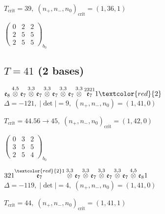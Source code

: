 \documentclass[10pt]{article}
\begin{document}
\hspace{1em}$T_{\text{crit}}=39,\; (n_+,n_-,n_0)_{\text{crit}}=(1,36,1)$

\hspace{2em}$\left(\begin{smallmatrix}0 & 2 & 2 \\ 2 & 5 & 5 \\ 2 & 5 & 5\end{smallmatrix}\right)_{\!b_0}$


\subsection*{$T = 41$ \quad (2 bases)}
\smallskip

$\mathfrak{e}_8\overset{4,5}{\otimes}\mathfrak{e}_7\overset{3,3}{\otimes}\mathfrak{e}_7\overset{3,3}{\otimes}\mathfrak{e}_7\overset{3,3}{\otimes}\mathfrak{e}_7\overset{3,3}{\otimes}\overset{2321}{\mathfrak{e}_7}1\textcolor{red}{2}$ \quad $\Delta=-121,\; |\det|=9,\; (n_+,n_-,n_0)=(1,41,0)$

\hspace{1em}$T_{\text{crit}}=44.56 \to 45,\; (n_+,n_-,n_0)_{\text{crit}}=(1,42,0)$

\hspace{2em}$\left(\begin{smallmatrix}0 & 3 & 2 \\ 3 & 5 & 5 \\ 2 & 5 & 4\end{smallmatrix}\right)_{\!b_0}$

\smallskip

$321\overset{\textcolor{red}{2}1}{\mathfrak{e}_7}\overset{3,3}{\otimes}\mathfrak{e}_7\overset{3,3}{\otimes}\mathfrak{e}_7\overset{3,3}{\otimes}\mathfrak{e}_7\overset{3,3}{\otimes}\mathfrak{e}_7\overset{4,5}{\otimes}\mathfrak{e}_81$ \quad $\Delta=-119,\; |\det|=4,\; (n_+,n_-,n_0)=(1,41,0)$

\hspace{1em}$T_{\text{crit}}=44,\; (n_+,n_-,n_0)_{\text{crit}}=(1,41,1)$
\end{document}
